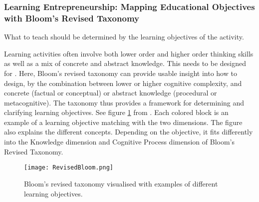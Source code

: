 


%


  \subsubsection{Learning Entrepreneurship: Mapping Educational Objectives with Bloom's Revised Taxonomy}

  What to teach should be determined by the learning objectives of the activity.

  Learning activities often involve both lower order and higher order thinking skills as well as a mix of concrete and abstract knowledge. This needs to be designed for . Here, Bloom's revised taxonomy can provide usable insight into how to design, by the combination between lower or higher cognitive complexity, and concrete (factual or conceptual) or abstract knowledge (procedural or metacognitive). \citep{cheong} The taxonomy thus provides a framework for determining and clarifying learning objectives. See figure \ref{fig:revised-bloom} from \citep{heer}. Each colored block is an example of a learning objective matching with the two dimensions. The figure also explains the different concepts. Depending on the objective, it fits differently into the Knowledge dimension and Cognitive Process dimension of Bloom's Revised Taxonomy. \citep{krathwohl}

  \begin{figure}[h]
    \centering
    \texttt{[image: RevisedBloom.png]}
    \caption{Bloom's revised taxonomy visualised with examples of different learning objectives.}
    \label{fig:revised-bloom}
\end{figure}

